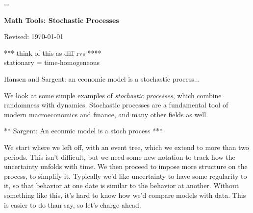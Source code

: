\documentclass[11pt]{article}
\begin{document}
\parskip=\bigskipamount
\parindent=0.0in
\thispagestyle{empty}


\bigskip\bigskip
\centerline{\Large \bf Math Tools:  Stochastic Processes}
\centerline{Revised: \today}


\begin{comment}
{\bf
*** Meyn and Tweedie re stability \\
*** Recursive approach \\
*** Limiting behavior of mean and (esp) variance \\
*** Law of iterated expectations
}
\end{comment}

*** think of this as diff rvs **** \\
stationary = time-homogeneous

\bigskip
Hansen and Sargent:  an economic model is a stochastic process...

We look at some simple examples of {\it stochastic processes\/},
which combine randomness with dynamics.
Stochastic processes are a fundamental tool of modern macroeconomics and finance,
and many other fields as well.

** Sargent:  An econmic model is a stoch process ***


We start where we left off,  with an event tree,
which we extend to more than two periods.
This isn't difficult, but we need some new notation to track how
the uncertainty unfolds with time.
We then proceed to impose more structure on the process, to simplify it.
Typically we'd like uncertainty to have some regularity to it,
so that behavior at one date is similar to the behavior at another.
Without something like this, it's hard to know how we'd compare models with data.
This is easier to do than say, so let's charge ahead.
\end{document}
